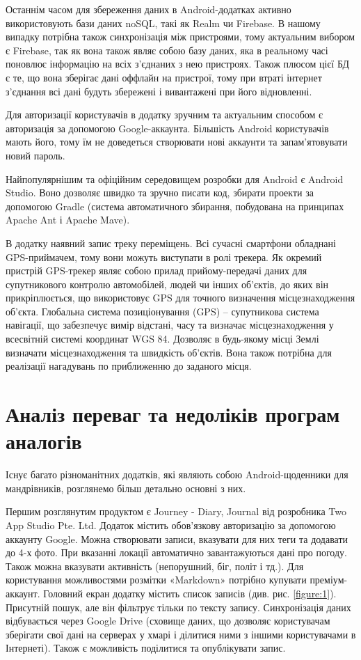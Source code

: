 \documentclass[../main.tex]{subfiles}
\begin{document}
Останнім часом для збереження даних в Android-додатках активно використовують бази даних noSQL, такі як Realm чи Firebase. В нашому випадку потрібна також синхронізація між пристроями, тому актуальним вибором є Firebase, так як вона також являє собою базу даних, яка в реальному часі поновлює інформацію на всіх з'єднаних з нею пристроях. Також плюсом цієї БД є те, що вона зберігає дані оффлайн на пристрої, тому при втраті інтернет з'єднання всі дані будуть збережені і вивантажені при його відновленні.

Для авторизації користувачів в додатку зручним та актуальним способом є авторизація за допомогою Google-аккаунта. Більшість Android користувачів мають його, тому їм не доведеться створювати нові аккаунти та запам'ятовувати новий пароль.

Найпопулярнішим та офіційним середовищем розробки для Android є Android Studio. 
Воно дозволяє швидко та зручно писати код, збирати проекти за допомогою Gradle (система автоматичного збирання, побудована на принципах Apache Ant і Apache Mave).

В додатку наявний запис треку переміщень. Всі сучасні смартфони обладнані GPS-приймачем, тому вони можуть виступати в ролі трекера.  Як окремий пристрій GPS-трекер являє собою прилад прийому-передачі даних для супутникового контролю автомобілей, людей чи інших об'єктів, до яких він прикріплюється, що використовує GPS для точного визначення місцезнаходження об'єкта. Глобальна система позиціонування (GPS) – супутникова система навігації, що забезпечує вимір відстані, часу та визначає місцезнаходження у всесвітній системі координат WGS 84. Дозволяє в будь-якому місці Землі визначати місцезнаходження та швидкість об'єктів. Вона також потрібна для реалізації нагадувань по приближенню до заданого місця.

\section{Аналіз переваг та недоліків програм аналогів}

Існує багато різноманітних додатків, які являють собою Android-щоденники для мандрівників, розглянемо більш детально основні з них.

Першим розглянутим продуктом є Journey - Diary, Journal від розробника Two App Studio Pte. Ltd. Додаток містить обов'язкову авторизацію за допомогою аккаунту Google. Можна створювати записи, вказувати для них теги та додавати до 4-х фото. При вказанні локації автоматично завантажуються дані про погоду. Також можна вказувати активність (непорушний, біг, політ і тд.). Для користування можливостями розмітки «Markdown» потрібно купувати преміум-аккаунт. Головний екран додатку містить список записів (див. рис. \ref{figure:1}). Присутній пошук, але він фільтрує тільки по тексту запису. Синхронізація даних відбувається через Google Drive (сховище даних, що дозволяє користувачам зберігати свої дані на серверах у хмарі і ділитися ними з іншими користувачами в Інтернеті). Також є можливість поділитися та опублікувати запис. 
\end{document}
